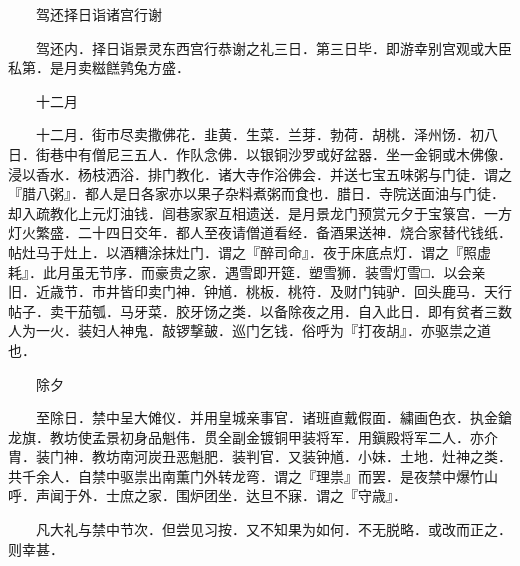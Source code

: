 　　驾还择日诣诸宫行谢

　　驾还内．择日诣景灵东西宫行恭谢之礼三日．第三日毕．即游幸别宫观或大臣私第．是月卖糍餻鹑兔方盛．

　　十二月

　　十二月．街市尽卖撒佛花．韭黄．生菜．兰芽．勃荷．胡桃．泽州饧．初八日．街巷中有僧尼三五人．作队念佛．以银铜沙罗或好盆器．坐一金铜或木佛像．浸以香水．杨枝洒浴．排门教化．诸大寺作浴佛会．并送七宝五味粥与门徒．谓之『腊八粥』．都人是日各家亦以果子杂料煮粥而食也．腊日．寺院送面油与门徒．却入疏教化上元灯油钱．闾巷家家互相遗送．是月景龙门预赏元夕于宝箓宫．一方灯火繁盛．二十四日交年．都人至夜请僧道看经．备酒果送神．烧合家替代钱纸．帖灶马于灶上．以酒糟涂抹灶门．谓之『醉司命』．夜于床底点灯．谓之『照虚耗』．此月虽无节序．而豪贵之家．遇雪即开筵．塑雪狮．装雪灯雪□．以会亲旧．近歳节．市井皆印卖门神．钟馗．桃板．桃符．及财门钝驴．回头鹿马．天行帖子．卖干茄瓠．马牙菜．胶牙饧之类．以备除夜之用．自入此日．即有贫者三数人为一火．装妇人神鬼．敲锣撃皷．巡门乞钱．俗呼为『打夜胡』．亦驱祟之道也．

　　除夕

　　至除日．禁中呈大傩仪．并用皇城亲事官．诸班直戴假面．繍画色衣．执金鎗龙旗．教坊使孟景初身品魁伟．贯全副金镀铜甲装将军．用鎭殿将军二人．亦介胄．装门神．教坊南河炭丑恶魁肥．装判官．又装钟馗．小妹．土地．灶神之类．共千余人．自禁中驱祟出南薫门外转龙弯．谓之『理祟』而罢．是夜禁中爆竹山呼．声闻于外．士庶之家．围炉团坐．达旦不寐．谓之『守歳』．

　　凡大礼与禁中节次．但尝见习按．又不知果为如何．不无脱略．或改而正之．则幸甚．

